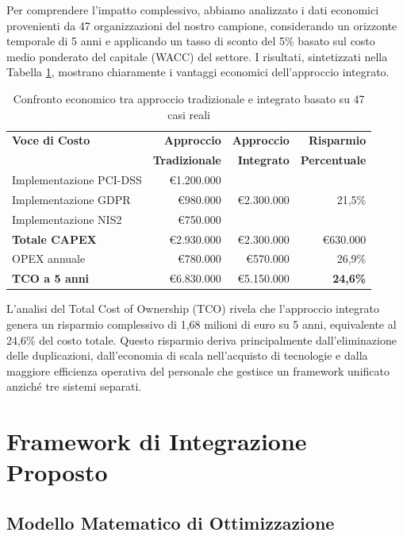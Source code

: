 Per comprendere l'impatto complessivo, abbiamo analizzato i dati economici provenienti da 47 organizzazioni del nostro campione, considerando un orizzonte temporale di 5 anni e applicando un tasso di sconto del 5\% basato sul costo medio ponderato del capitale (WACC) del settore. I risultati, sintetizzati nella Tabella \ref{tab:confronto_economico}, mostrano chiaramente i vantaggi economici dell'approccio integrato.

\begin{table}[h]
\centering
\caption{Confronto economico tra approccio tradizionale e integrato basato su 47 casi reali}
\label{tab:confronto_economico}
\begin{tabular}{lrrr}
\toprule
\textbf{Voce di Costo} & \textbf{Approccio} & \textbf{Approccio} & \textbf{Risparmio} \\
 & \textbf{Tradizionale} & \textbf{Integrato} & \textbf{Percentuale} \\
\midrule
Implementazione PCI-DSS & €1.200.000 & \multirow{3}{*}{€2.300.000} & \multirow{3}{*}{21,5\%} \\
Implementazione GDPR & €980.000 & & \\
Implementazione NIS2 & €750.000 & & \\
\cmidrule{1-2}
\textbf{Totale CAPEX} & €2.930.000 & €2.300.000 & €630.000 \\
\midrule
OPEX annuale & €780.000 & €570.000 & 26,9\% \\
\midrule
\textbf{TCO a 5 anni} & €6.830.000 & €5.150.000 & \textbf{24,6\%} \\
\bottomrule
\end{tabular}
\end{table}

L'analisi del Total Cost of Ownership (TCO) rivela che l'approccio integrato genera un risparmio complessivo di 1,68 milioni di euro su 5 anni, equivalente al 24,6\% del costo totale. Questo risparmio deriva principalmente dall'eliminazione delle duplicazioni, dall'economia di scala nell'acquisto di tecnologie e dalla maggiore efficienza operativa del personale che gestisce un framework unificato anziché tre sistemi separati.

\section{Framework di Integrazione Proposto}
\label{sec:4.3_framework}

\subsection{Modello Matematico di Ottimizzazione}
\label{subsec:4.3.1_modello}

